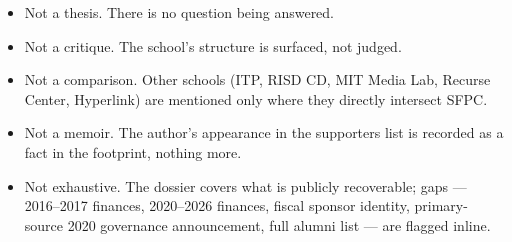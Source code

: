 \documentclass[10pt,letterpaper,twocolumn]{article}
\begin{document}
\begin{itemize}
\item Not a thesis. There is no question being answered.
\item Not a critique. The school's structure is surfaced, not judged.
\item Not a comparison. Other schools (ITP, RISD CD, MIT Media Lab, Recurse Center, Hyperlink) are mentioned only where they directly intersect SFPC.
\item Not a memoir. The author's appearance in the supporters list is recorded as a fact in the footprint, nothing more.
\item Not exhaustive. The dossier covers what is publicly recoverable; gaps --- 2016--2017 finances, 2020--2026 finances, fiscal sponsor identity, primary-source 2020 governance announcement, full alumni list --- are flagged inline.
\end{itemize}



\end{document}
